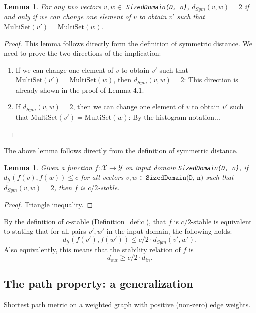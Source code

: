\documentclass[11pt,a4paper]{article}
\newtheorem{lemma}[theorem]{Lemma}
\theoremstyle{definition}
\newcommand{\MultiSet}{\mathrm{MultiSet}}
\newcommand{\din}{d_{in}}
\newcommand{\dout}{d_{out}}
\newcommand{\Y}{\mathcal{Y}}
\newcommand{\silvia}[1]{{ {\color{blue}{(silvia)~#1}}}}
\begin{document}
\silvia{Notation is bad. Maybe change to $v[i]$ to denote $i$-th element of $v$.}

\begin{lemma}\label{lemma:path2}
    For any two vectors $v, w \in$ \texttt{SizedDomain(D, n)}, $d_{Sym}(v, w) = 2$ if and only if we can change one element of $v$ to obtain $v'$ such that $\MultiSet(v') = \MultiSet(w)$.
\end{lemma}

\begin{proof}
    This lemma follows directly form the definition of symmetric distance. We need to prove the two directions of the implication:
    \begin{enumerate}
        \item If we can change one element of $v$ to obtain $v'$ such that $\MultiSet(v') = \MultiSet(w)$, then $d_{Sym}(v, w) = 2$: This direction is already shown in the proof of Lemma 4.1.
        \item If $d_{Sym}(v, w) = 2$, then we can change one element of $v$ to obtain $v'$ such that $\MultiSet(v') = \MultiSet(w)$: By the histogram notation...
    \end{enumerate}
\end{proof}

The above lemma follows directly from the definition of symmetric distance. 

\begin{lemma}\label{lemma:path3}
Given a function $f: \mathcal{X} \rightarrow \mathcal{Y}$ on input domain \texttt{SizedDomain(D, n)}, if $d_{\mathcal{Y}}(f(v), f(w)) \leq c$ for all vectors $v, w \in \texttt{SizedDomain(D, n)}$ such that $d_{Sym}(v, w) = 2$, then $f$ is $c/2$-stable.
\end{lemma}

\begin{proof}
    Triangle inequality.
\end{proof}

By the definition of $c$-stable (Definition~\ref{def:c}), 
that $f$ is $c/2$-stable is equivalent to stating that for all pairs $v', w'$ in the input domain, the following holds:
\[
    d_{\Y}(f(v'), f(w')) \leq c/2 \cdot d_{Sym}(v', w').
\]
Also equivalently, this means that the stability relation of $f$ is
\[
    \dout \geq c/2 \cdot \din.
\]

\subsection{The path property: a generalization}
Shortest path metric on a weighted graph with positive (non-zero) edge weights. 
\end{document}

